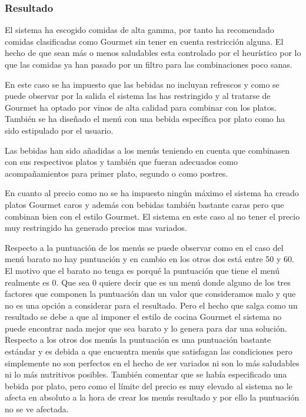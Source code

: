 \documentclass{article}
\begin{document}
\subsubsection{Resultado}
El sistema ha escogido comidas de alta gamma, por tanto ha recomendado comidas clasificadas como Gourmet sin tener en cuenta restricción alguna. El hecho de que sean más o menos saludables esta controlado por el heurístico por lo que las comidas ya han pasado por un filtro para las combinaciones poco sanas.
\par
En este caso se ha impuesto que las bebidas no incluyan refrescos y como se puede observar por la salida el sistema las has restringido y al tratarse de Gourmet ha optado por vinos de alta calidad para combinar con los platos. También se ha diseñado el menú con una bebida específica por plato como ha sido estipulado por el usuario.
\par
Las bebidas han sido añadidas a los menús teniendo en cuenta que combinasen con sus respectivos platos y también que fueran adecuados como acompañamientos para primer plato, segundo o como postres.
\par
En cuanto al precio como no se ha impuesto ningún máximo el sistema ha creado platos Gourmet caros y además con bebidas también bastante caras pero que combinan bien con el estilo Gourmet. El sistema en este caso al no tener el precio muy restringido ha generado precios mas variados.
\par
Respecto a la puntuación de los menús se puede observar como en el caso del menú barato no hay puntuación y en cambio en los otros dos está entre 50 y 60. El motivo que el barato no tenga es porqué la puntuación que tiene el menú realmente es 0. Que sea 0 quiere decir que es un menú donde alguno de los tres factores que componen la puntuación dan un valor que consideramos malo y que no es una opción a considerar para el resultado. Pero el hecho que salga como un resultado se debe a que al imponer el estilo de cocina Gourmet el sistema no puede encontrar nada mejor que sea barato y lo genera para dar una solución.
Respecto a los otros dos menús la puntuación es una puntuación bastante estándar y es debida a que encuentra menús que satisfagan las condiciones pero simplemente no son perfectos en el hecho de ser variados ni son lo más saludables ni lo más nutritivos posibles.
También comentar que se había especificado una bebida por plato, pero como el límite del precio es muy elevado al sistema no le afecta en absoluto a la hora de crear los menús resultado y por ello la puntuación no se ve afectada.
\end{document}
